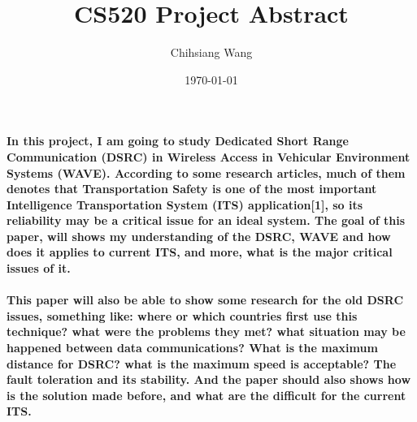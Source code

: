 \documentclass[12pt,a4paper]{article}
\title {CS520 Project Abstract}
\author {Chihsiang Wang}
\date {\today}
\begin{document}
\maketitle

\thispagestyle{empty} 


\paragraph{
In this project, I am going to study Dedicated Short Range Communication (DSRC) in Wireless Access in Vehicular Environment Systems (WAVE). According to some research articles, much of them denotes that Transportation Safety is one of the most important Intelligence Transportation System (ITS) application[1], so its reliability may be a critical issue for an ideal system. The goal of this paper, will shows my understanding of the DSRC, WAVE and how does it applies to current ITS, and more, what is the major critical issues of it.}

\paragraph{
This paper will also be able to show some research for the old DSRC issues, something like: where or which countries first use this technique? what were the problems they met? what situation may be happened between data communications? What is the maximum distance for DSRC? what is the maximum speed is acceptable? The fault toleration and its stability.  And the paper should also shows how is the solution made before, and what are the difficult for the current ITS.}
\end{document}
